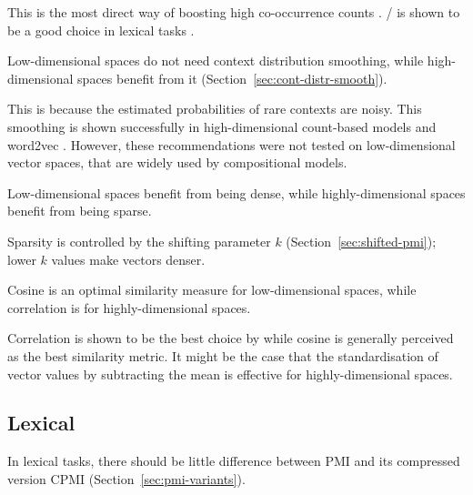 This is the most direct way of boosting high co-occurrence counts \cite{Evert05}. \NPMI/ is shown to be a good choice in lexical tasks \cite{Bruni:2012:DST:2390524.2390544}.

\begin{hyp}
  \label{hyp:cds}
  Low-dimensional spaces do not need context distribution smoothing, while high-dimensional spaces benefit from it (Section~\ref{sec:cont-distr-smooth}).
\end{hyp}

This is because the estimated probabilities of rare contexts are noisy. This smoothing is shown successfully in high-dimensional count-based models \cite{TACL570} and word2vec \cite{mikolov2013efficient}. However, these recommendations were not tested on low-dimensional vector spaces, that are widely used by compositional models. 

\begin{hyp}
  \label{hyp:neg}
  Low-dimensional spaces benefit from being dense, while highly-dimensional spaces benefit from being sparse.
\end{hyp}

Sparsity is controlled by the shifting parameter $k$ (Section~\ref{sec:shifted-pmi}); lower $k$ values make vectors denser.

\begin{hyp}
  \label{hyp:similarity}
  Cosine is an optimal similarity measure for low-dimensional spaces, while correlation is for highly-dimensional spaces.
\end{hyp}

Correlation is shown to be the best choice by \citet{kiela-clark:2014:CVSC} while cosine is generally perceived as the best similarity metric. It might be the case that the standardisation of vector values by subtracting the mean is effective for highly-dimensional spaces.

\subsection{Lexical}
\label{sec:elab-hypoth-lexical}


\begin{hyp}
  \label{hyp:lex-pmi-cpmi}
  In lexical tasks, there should be little difference between PMI and its compressed version CPMI (Section~\ref{sec:pmi-variants}).
\end{hyp}

